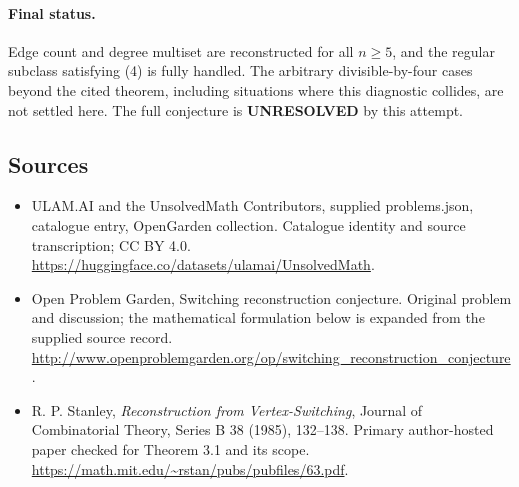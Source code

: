 \documentclass[11pt,a4paper]{article}
\begin{document}
\paragraph{Final status.}
Edge count and degree multiset are reconstructed for all $n\ge5$, and the regular subclass satisfying (4) is fully handled. The arbitrary divisible-by-four cases beyond the cited theorem, including situations where this diagnostic collides, are not settled here. The full conjecture is \textbf{UNRESOLVED} by this attempt.

\subsection{Sources}
\begin{itemize}
\item[S1] ULAM.AI and the UnsolvedMath Contributors, supplied problems.json, catalogue entry, OpenGarden collection. Catalogue identity and source transcription; CC BY 4.0.
\url{https://huggingface.co/datasets/ulamai/UnsolvedMath}.
\item[S2] Open Problem Garden, Switching reconstruction conjecture. Original problem and discussion; the mathematical formulation below is expanded from the supplied source record.
\url{http://www.openproblemgarden.org/op/switching_reconstruction_conjecture}.
\item[R1] R. P. Stanley, \emph{Reconstruction from Vertex-Switching}, Journal of Combinatorial Theory, Series B 38 (1985), 132--138. Primary author-hosted paper checked for Theorem 3.1 and its scope.
\url{https://math.mit.edu/~rstan/pubs/pubfiles/63.pdf}.
\end{itemize}
\end{document}
